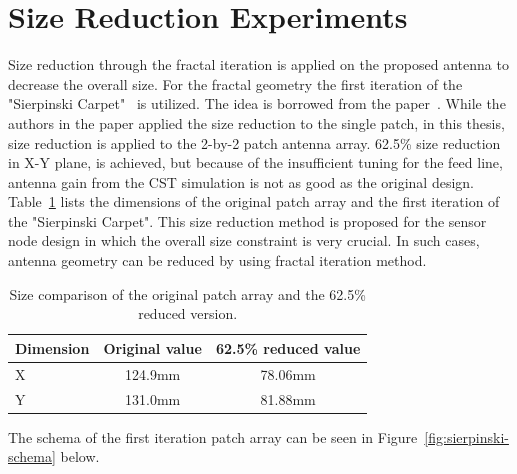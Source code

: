\documentclass[12pt, oneandhalf, chaparabic, sees, ms]{metu}
\begin{document}
\newpage
\section{Size Reduction Experiments}\label{ssizeantenna}
\vspace{-0.5cm}
Size reduction through the fractal iteration is applied on the proposed antenna to decrease the overall size.
For the fractal geometry the first iteration of the "Sierpinski Carpet"~\cite{sierpinski} is utilized.
The idea is borrowed from the paper~\cite{shrestha2013}. While the authors in the paper applied the size reduction to the single patch,
in this thesis, size reduction is applied to the 2-by-2 patch antenna array.
62.5\% size reduction in X-Y plane, is achieved, but because of the insufficient 
tuning for the feed line, antenna gain from the CST simulation is not as good as the original design. 
Table~\ref{tab:reduced-fractal} lists the dimensions of the original patch array and the first iteration of the "Sierpinski Carpet". 
This size reduction method is proposed for the sensor node design in which the overall size constraint is very crucial.
In such cases, antenna geometry can be reduced by using fractal iteration method.


\renewcommand{\arraystretch}{1.2}%
\begin{table}[H]
\begin{center}
\caption{Size comparison of the original patch array and the 62.5\% reduced version.}
\label{tab:reduced-fractal}
\begin{adjustbox}{max width=\textwidth}
\begin{tabular}{| l || c | c |}
\hline
\rowcolor{lightgray}
\textbf{Dimension} & \textbf{Original value}  & \textbf{62.5\% reduced value} \tabularnewline
\hline \hline 
\cellcolor{lightgray} X        &  124.9mm &  78.06mm   \tabularnewline \hline
\cellcolor{lightgray} Y        &  131.0mm &  81.88mm  \tabularnewline \hline
\end{tabular}
\end{adjustbox}
\end{center}
\end{table}
\renewcommand{\arraystretch}{1}%

\vspace{-0.5cm}
The schema of the first iteration patch array can be seen in Figure~\ref{fig:sierpinski-schema} below.
%
\end{document}
